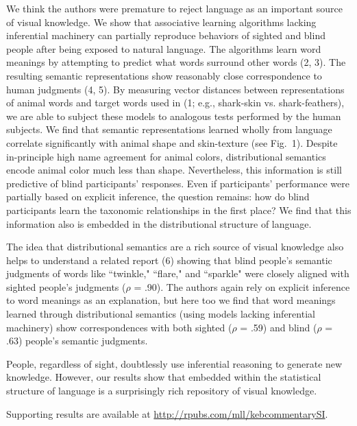 \documentclass[12pt]{article}
\begin{document}
We think the authors were premature to reject language as an important source of visual knowledge. We show that associative learning algorithms lacking inferential machinery can partially reproduce behaviors of sighted and blind people after being exposed to natural language. The algorithms learn word meanings by attempting to predict what words surround other words (2, 3). The resulting semantic representations show reasonably close correspondence to human judgments  (4, 5). By measuring vector distances between representations of animal words and target words used in (1; e.g., shark-skin vs. shark-feathers), we are able to subject these models to analogous tests performed by the human subjects. We find that semantic representations learned wholly from language correlate significantly with animal shape and skin-texture (see Fig.\ 1). Despite in-principle high name agreement for animal colors, distributional semantics encode animal color much less than shape. Nevertheless, this information is still predictive of blind participants' responses. Even if participants' performance were partially based on explicit inference, the question remains: how do blind participants learn the taxonomic relationships in the first place? We find that this information  also is embedded in the distributional structure of language. 

The idea that distributional semantics are a rich source of visual knowledge also helps to understand a related report (6) showing that blind people's semantic judgments of words like ``twinkle," ``flare," and ``sparkle" were closely aligned with sighted people's judgments ($\rho$ = .90). The authors again rely on explicit inference to word meanings as an explanation, but here too we find that word meanings learned through distributional semantics (using models lacking inferential machinery) show correspondences with both sighted ($\rho$ = .59) and blind ($\rho$ = .63) people's semantic judgments. 

People, regardless of sight, doubtlessly use inferential reasoning to generate new knowledge. However, our results show that embedded within the statistical structure of language is a surprisingly rich repository of visual knowledge.

Supporting results are available at \url{http://rpubs.com/mll/kebcommentarySI}.
\pagebreak
\end{document}
